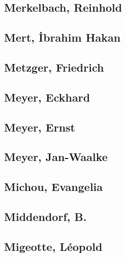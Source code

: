 \subsection[Merkelbach, Reinhold (3)]{Merkelbach, Reinhold}



\subsection[Mert, İbrahim Hakan (1)]{Mert, İbrahim Hakan}

\subsection[Metzger, Friedrich (1)]{Metzger, Friedrich}

\subsection[Meyer, Eckhard (1)]{Meyer, Eckhard}

\subsection[Meyer, Ernst (1)]{Meyer, Ernst}

\subsection[Meyer, Jan-Waalke (1)]{Meyer, Jan-Waalke}

\subsection[Michou, Evangelia (1)]{Michou, Evangelia}

\subsection[Middendorf, B. (1)]{Middendorf, B.}

\subsection[Migeotte, Léopold (3)]{Migeotte, Léopold}

